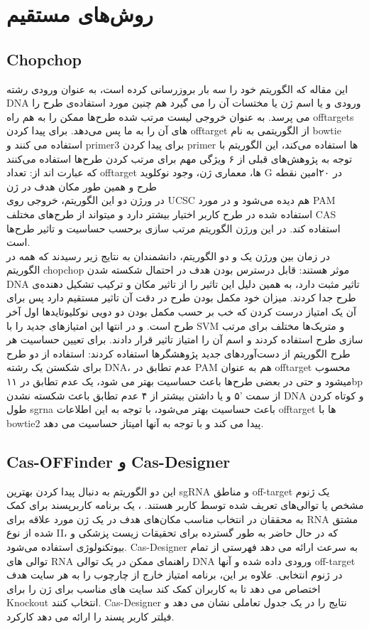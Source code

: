 \documentclass[12pt,a4paper,BCOR=.7cm,headsepline,bibliography=totoc]{report}
\begin{document}
\section{روش‌های مستقیم}
\subsection{Chopchop}
این مقاله که الگوریتم خود را سه بار بروزرسانی کرده است، به عنوان ورودی رشته DNA ورودی و یا اسم ژن یا مختسات آن را می گیرد هم چنین مورد استفاده‌ی طرح را می پرسد. به عنوان خروجی لیست مرتب شده طرح‌ها ممکن را به هم راه offtargets های آن را به ما پس می‌دهد. برای پیدا کردن offtarget از الگوریتمی به نام bowtie استفاده می کنند و primer3 برای پیدا کردن primer ها استفاده می‌کند، این الگوریتم با توجه به پژوهش‌های قبلی از ۶ ویژگی مهم برای مرتب کردن طرح‌ها استفاده می‌کنند که عبارت اند از: تعداد offtarget ها، معماری ژن،  وجود نوکلوید G در ۲۰امین نقطه طرح و همین طور مکان هدف در ژن \\
در ورژن دو این الگوریتم، خروجی روی UCSC هم دیده می‌شود و در مورد PAM استفاده شده در طرح کاربر اختیار بیشتر دارد و میتواند از طرح‌های مختلف CAS استفاده کند. در این ورژن الگوریتم مرتب سازی برحسب حساسیت و تاثیر طرح‌ها است.\\
در زمان بین ورژن یک و دو الگوریتم، دانشمندان به نتایج زیر رسیدند که همه در الگوریتم chopchop موثر هستند: قابل درسترس بودن هدف در احتمال شکسته شدن DNA تاثیر مثبت دارد، به همین دلیل این تاثیر را از تاثیر مکان و ترکیب تشکیل دهنده‌ی طرح جدا کردند.
میزان خود مکمل بودن طرح در دقت آن تاثیر مستقیم دارد پس برای آن یک امتیاز درست کردن که خب بر حسب مکمل بودن دو دویی نوکلیوتاید‌ها اول آخر طرح است. و در انتها این امتیاز‌های جدید را با SVM و متریک‌ها مختلف برای مرتب سازی طرح استفاده کردند و اسم آن را امتیاز تاثیر قرار دادند.
برای تعیین حساسیت هر طرح الگوریتم از دست‌آورد‌های جدید پژوهشگر‌ها استفاده کردند: استفاده از دو طرح برای شکستن یک رشته DNA، عدم تطابق در PAM هم به عنوان offtarget محسوب میشود و حتی در بعضی طرح‌ها باعث حساسیت بهتر می شود، یک عدم تطابق در ۱۱bp از سمت ‍'۵ و یا داشتن بیشتر از ۴ عدم تطابق باعث شکسته نشدن  DNA و کوتاه کردن طول sgrna باعث حساسیت بهتر می‌شود، با توجه به این اطلاعات offtarget ها با bowtie2 پیدا می کند و با توجه به آنها امیتاز حساسیت می دهد.

\subsection{Cas-OFFinder و Cas-Designer}
این دو الگوریتم به دنبال پیدا کردن بهترین sgRNA و مناطق off-target یک ژنوم مشخص یا توالی‌های تعریف شده توسط کاربر هستند.
،
 یک برنامه کاربرپسند برای کمک به محققان در انتخاب مناسب مکان‌های هدف در یک ژن مورد علاقه برای RNA مشتق شده از نوع II، که در حال حاضر به طور گسترده برای تحقیقات زیست پزشکی و بیوتکنولوژی استفاده می‌شود. Cas-Designer به سرعت ارائه می دهد
فهرستی از تمام توالی های RNA راهنمای ممکن در یک توالی DNA ورودی داده شده و آنها off-target در ژنوم انتخابی. علاوه بر این، برنامه امتیاز خارج از چارچوب را به هر سایت هدف اختصاص می دهد تا به کاربران کمک کند سایت های مناسب برای ژن را برای Knockout انتخاب کنند.
 Cas-Designer نتایج را در یک جدول تعاملی نشان می دهد و فیلتر کاربر پسند را ارائه می دهد
کارکرد.
\end{document}
